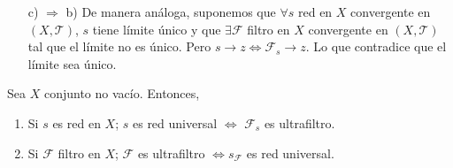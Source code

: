 \begin{dem}
\begin{enumerate}[label=(\roman*)]
    \item [c) $\Rightarrow$ b)] De manera análoga, suponemos que $\forall s$ red en $X$ convergente en $( X, \mathcal{T} )$, $s$ tiene límite único y que $\exists \mathcal{F}$ filtro en $X$ convergente en $( X, \mathcal{T} )$ tal que el límite no es único. Pero $s \rightarrow z \Leftrightarrow \mathcal{F}_{s} \rightarrow z$. Lo que contradice que el límite sea único.
  \end{enumerate}
\end{dem}

\begin{prop}
  Sea $X$ conjunto no vacío. Entonces,
  \begin{enumerate}[label=(\roman*)]
    \item Si $s$ es red en $X$; $s$ es red universal $\Leftrightarrow$ $\mathcal{F}_{s}$ es ultrafiltro.
    \item Si $\mathcal{F}$ filtro en $X$; $\mathcal{F}$ es ultrafiltro $\Leftrightarrow s_{\mathcal{F}}$ es red universal.
  \end{enumerate}
\end{prop}

